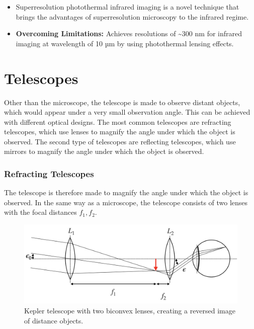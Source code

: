 \documentclass[
  a4paper,
]{book}
\providecommand{\tightlist}{%
  \setlength{\itemsep}{0pt}\setlength{\parskip}{0pt}}
\begin{document}
\begin{tcolorbox}
\begin{enumerate}
  \begin{itemize}
  \tightlist
  \item
    Superresolution photothermal infrared imaging is a novel technique
    that brings the advantages of superresolution microscopy to the
    infrared regime.
  \item
    \textbf{Overcoming Limitations:} Achieves resolutions of
    \textasciitilde300 nm for infrared imaging at wavelength of 10 µm by
    using photothermal lensing effects.
  \end{itemize}
\end{enumerate}

\end{tcolorbox}

\chapter{Telescopes}\label{telescopes}

Other than the microscope, the telescope is made to observe distant
objects, which would appear under a very small observation angle. This
can be achieved with different optical designs. The most common
telescopes are refracting telescopes, which use lenses to magnify the
angle under which the object is observed. The second type of telescopes
are reflecting telescopes, which use mirrors to magnify the angle under
which the object is observed.

\subsection{Refracting Telescopes}\label{refracting-telescopes}

The telescope is therefore made to magnify the angle under which the
object is observed. In the same way as a microscope, the telescope
consists of two lenses with the focal distances \(f_1,f_2\).

\begin{figure}[H]

{\centering \includegraphics[width=0.6\linewidth,height=\textheight,keepaspectratio]{geometrical-optics/img/telescope.png}

}

\caption{Kepler telescope with two biconvex lenses, creating a reversed
image of distance objects.}

\end{figure}%
\end{document}
